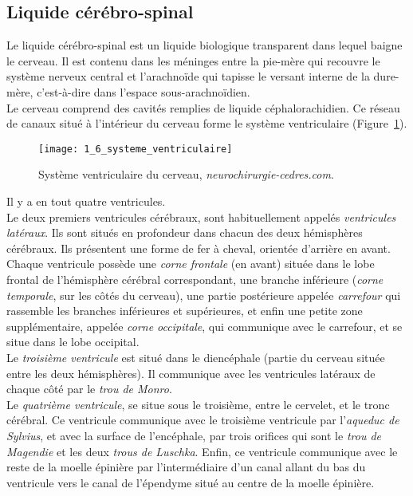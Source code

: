 \subsection{Liquide cérébro-spinal}
Le liquide cérébro-spinal est un liquide biologique transparent dans lequel baigne le cerveau. Il est contenu dans les méninges entre la pie-mère qui recouvre le système nerveux central et l’arachnoïde qui tapisse le versant interne de la dure-mère, c’est-à-dire dans l’espace sous-arachnoïdien.\\
Le cerveau comprend des cavités remplies de liquide céphalorachidien. Ce réseau de canaux situé à l’intérieur du cerveau forme le système ventriculaire (Figure~\ref{fig:1_6_systeme_ventriculaire}).
\begin{figure}[!t]
\centering
\texttt{[image: 1\_6\_systeme\_ventriculaire]}
\caption{Système ventriculaire du cerveau,  {\em neurochirurgie-cedres.com}. }
\label{fig:1_6_systeme_ventriculaire}	
\end{figure}
Il y a en tout quatre ventricules.\\
Le deux premiers ventricules cérébraux, sont habituellement appelés {\em ventricules latéraux}. Ils sont situés en profondeur dans chacun des deux hémisphères cérébraux. Ils présentent une forme de fer à cheval, orientée d'arrière en avant. Chaque ventricule possède une {\em corne frontale} (en avant) située dans le lobe frontal de l'hémisphère cérébral correspondant, une branche inférieure ({\em corne temporale}, sur les côtés du cerveau), une partie postérieure appelée {\em carrefour} qui rassemble les branches inférieures et supérieures, et enfin une petite zone supplémentaire, appelée {\em corne occipitale}, qui communique avec le carrefour, et se situe dans le lobe occipital.\\
Le {\em troisième ventricule} est situé dans le diencéphale (partie du cerveau située entre les deux hémisphères). Il communique avec les ventricules latéraux de chaque côté par le {\em trou de Monro}.\\
Le {\em quatrième ventricule}, se situe sous le troisième, entre le cervelet, et le tronc cérébral. Ce ventricule communique avec le troisième ventricule par l'{\em aqueduc de Sylvius}, et avec la surface de l'encéphale, par trois orifices qui sont le {\em trou de Magendie} et les deux {\em trous de Luschka}. Enfin, ce ventricule communique avec le reste de la moelle épinière par l'intermédiaire d'un canal allant du bas du ventricule vers le canal de l'épendyme situé au centre de la moelle épinière.
